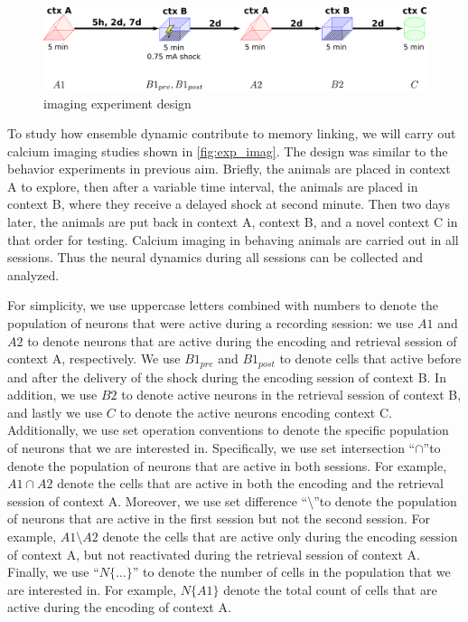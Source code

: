 \documentclass[master.tex]{subfiles}
\begin{document}
\begin{figure}[!b]
  \centering \includegraphics[scale = .135]{Figures/exp_imag.pdf}
  \caption{\footnotesize imaging experiment design}
  \label{fig:exp_imag}
\end{figure}

To study how ensemble dynamic contribute to memory linking, we will carry out
calcium imaging studies shown in \autoref{fig:exp_imag}. The design was similar
to the behavior experiments in previous aim. Briefly, the animals are placed in
context A to explore, then after a variable time interval, the animals are
placed in context B, where they receive a delayed shock at second minute. Then
two days later, the animals are put back in context A, context B, and a novel
context C in that order for testing. Calcium imaging in behaving animals are
carried out in all sessions. Thus the neural dynamics during all sessions can be
collected and analyzed.

For simplicity, we use uppercase letters combined with numbers to denote the
population of neurons that were active during a recording session: we use $A1$
and $A2$ to denote neurons that are active during the encoding and retrieval
session of context A, respectively. We use $B1_{pre}$ and $B1_{post}$ to denote
cells that active before and after the delivery of the shock during the encoding
session of context B. In addition, we use $B2$ to denote active neurons in the
retrieval session of context B, and lastly we use $C$ to denote the active
neurons encoding context C. Additionally, we use set operation conventions to
denote the specific population of neurons that we are interested in.
Specifically, we use set intersection ``$\cap$''to denote the population of
neurons that are active in both sessions. For example, $A1 \cap A2$ denote the
cells that are active in both the encoding and the retrieval session of context
A. Moreover, we use set difference ``$\setminus$''to denote the population of
neurons that are active in the first session but not the second session. For
example, $A1 \setminus A2$ denote the cells that are active only during the
encoding session of context A, but not reactivated during the retrieval session
of context A. Finally, we use ``$N\{\ldots\}$'' to denote the number of cells in
the population that we are interested in. For example, $N\{A1\}$ denote the
total count of cells that are active during the encoding of context A.
\end{document}
